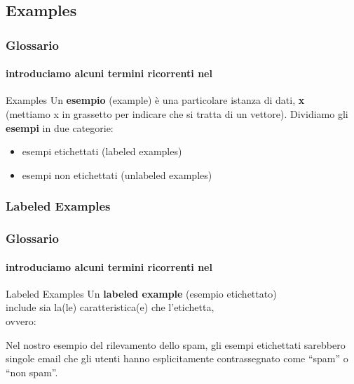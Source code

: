 \subsection[Examples]{Examples}
\begin{frame}

	\frametitle{Glossario}
	\framesubtitle{introduciamo alcuni termini ricorrenti nel \ml}

	\begin{block}{Examples}
		Un \textbf{esempio} (example) è una particolare istanza di dati, \textbf{x}\\
		(mettiamo x in grassetto per indicare che si tratta di un vettore).
		\newlinedouble
		Dividiamo gli \textbf{esempi} in due categorie:
		\begin{itemize}
			\item esempi etichettati (labeled examples)
			\item esempi non etichettati (unlabeled examples)
		\end{itemize}

	\end{block}

\end{frame}


\subsubsection[Labeled Examples]{Labeled Examples}
\begin{frame}

	\frametitle{Glossario}
	\framesubtitle{introduciamo alcuni termini ricorrenti nel \ml}

	\begin{block}{Labeled Examples}
		Un \textbf{labeled example} (esempio etichettato)\\
		include sia la(le) caratteristica(e) che l'etichetta,\\
		ovvero:
		\newlinedouble
		\newlinedouble

		Nel nostro esempio del rilevamento dello spam, gli esempi etichettati sarebbero singole email che gli utenti hanno esplicitamente contrassegnato come ``spam'' o ``non spam''.

	\end{block}

\end{frame}


